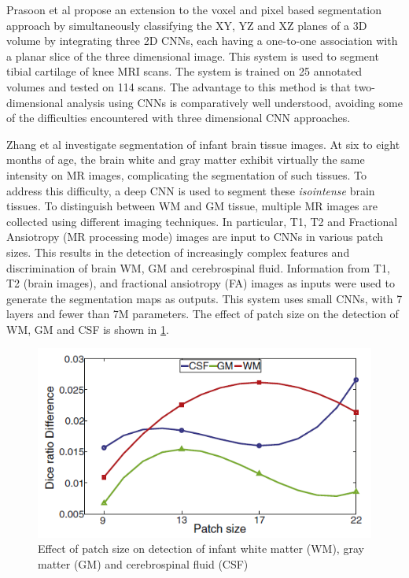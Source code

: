 \documentclass[letterpaper, 10 pt, conference]{ieeeconf}  %
\begin{document}
Prasoon et al \cite{prasoon_deep_2013} propose an extension to the voxel and pixel based segmentation approach by simultaneously classifying the XY, YZ and XZ planes of a 3D volume by integrating three 2D CNNs, each having a one-to-one association with a planar slice of the three dimensional image.  This system is used to segment tibial cartilage of knee MRI scans. The system is trained on 25 annotated volumes and tested on 114 scans. The advantage to this method is that two-dimensional analysis using CNNs is comparatively well understood, avoiding some of the difficulties encountered with three dimensional CNN approaches.  

Zhang et al \cite{zhang_deep_2015} investigate segmentation of infant brain tissue images. At six to eight months of age, the brain white and gray matter exhibit virtually the same intensity on MR images, complicating the segmentation of such tissues. To address this difficulty, a deep CNN is used to segment these \textit{isointense} brain tissues. To distinguish between WM and GM tissue, multiple MR images are collected using different imaging techniques. In particular, T1, T2 and Fractional Ansiotropy (MR processing mode) images are input to CNNs in various patch sizes. This results in the detection of increasingly complex features and discrimination of brain WM, GM and cerebrospinal fluid. Information from T1, T2 (brain images), and fractional ansiotropy (FA) images as inputs were used to generate the segmentation maps as outputs. This system uses small CNNs, with 7 layers and fewer than 7M parameters. The effect of patch size on the detection of WM, GM and CSF is shown in \ref{fig:zhangbaby}.

\begin{figure}
  \includegraphics[width=\linewidth]{images/zhangbaby.png}
  \caption{Effect of patch size on detection of infant white matter (WM), gray matter (GM) and cerebrospinal fluid (CSF) \cite{zhang_deep_2015}}
  \label{fig:zhangbaby}
\end{figure}
\end{document}
